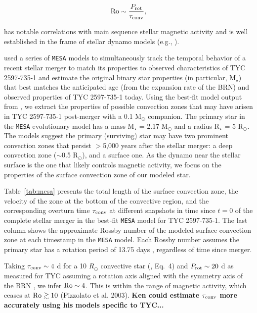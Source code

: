 \documentclass[]{aastex631}
\begin{document}
\begin{equation}
{\rm Ro} \sim \frac{P_{\rm rot}}{\tau_{\rm conv}},
\end{equation}

has notable correlations with main sequence stellar magnetic activity and is well established in the frame of stellar dynamo models (e.g., \citealt{Brandenburg+1998}).

\citet{2020Natur.587..387H} used a series of \texttt{MESA} models to simultaneously track the temporal behavior of a recent stellar merger to match its properties to observed characteristics of TYC 2597-735-1 and estimate the original binary star properties (in particular, M$_{\star}$) that best matches the anticipated age (from the expansion rate of the BRN) and observed properties of TYC 2597-735-1 today. Using the best-fit model output from \citet{2002ApJ...576L.149R}, we extract the properties of possible convection zones that may have arisen in TYC 2597-735-1 post-merger with a 0.1 M$_{\odot}$ companion. The primary star in the \texttt{MESA} evolutionary model has a mass M$_{\star}$ = 2.17 M$_{\odot}$ and a radius R$_{\star}$ = 5 R$_{\odot}$. The models suggest the primary (surviving) star may have two prominent convection zones that persist $>$5,000 years after the stellar merger: a deep convection zone ($\sim$0.5 R$_{\odot}$), and a surface one. As the dynamo near the stellar surface is the one that likely controls magnetic activity, we focus on the properties of the surface convection zone of our modeled star.




Table~\ref{tab:mesa} presents the total length of the surface convection zone, the velocity of the zone at the bottom of the convective region, and the corresponding overturn time $\tau_{\rm conv}$ at different snapshots in time since $t=0$ of the complete stellar merger in the \citet{2020Natur.587..387H} best-fit \texttt{MESA} model for TYC 2597-735-1. The last column shows the approximate Rossby number of the modeled surface convection zone at each timestamp in the \texttt{MESA} model. Each Rossby number assumes the primary star has a rotation period of 13.75 days \citep{2020Natur.587..387H}, regardless of time since merger.

Taking $\tau_{\rm conv} \sim 4$ d for a 10 $R_{\odot}$ convective star (\citealt{Soker&Tylenda2007}, Eq.~4) and $P_{\rm rot} \sim 20$ d as measured for TYC assuming a rotation axis aligned with the symmetry axis of the BRN \citep{2020Natur.587..387H}, we infer ${\rm Ro} \sim 4$.  This is within the range of magnetic activity, which ceases at ${\rm Ro} \gtrsim 10$ (Pizzolato et al. 2003).   {\bf Ken could estimate $\tau_{\rm conv}$ more accurately using his models specific to TYC...}
\end{document}
